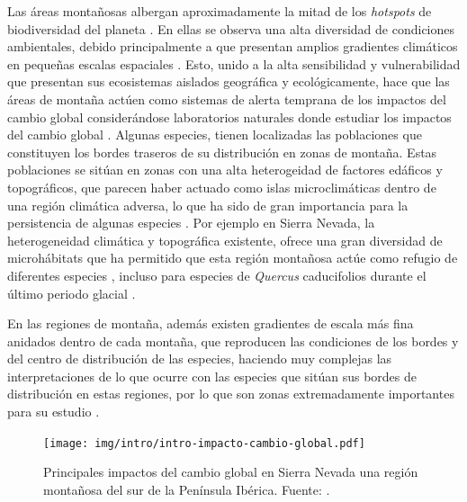 Las áreas montañosas albergan aproximadamente la mitad de los \emph{hotspots} de biodiversidad del planeta \autocite[][]{SpehnKorner2009MountainLaboratory,Kohleretal2014MountainsClimate}. En ellas se observa una alta diversidad de condiciones ambientales, debido principalmente a que presentan amplios gradientes climáticos en pequeñas escalas espaciales \autocites{Kohleretal2014MountainsClimate, Zamoraetal2021UniendoMacro}. Esto, unido a la alta sensibilidad y vulnerabilidad que presentan sus ecosistemas aislados geográfica y ecológicamente, hace que las áreas de montaña actúen como sistemas de alerta temprana de los impactos del cambio global \autocites{KohlerMaselli2009MountainsClimate,MacchiICIMOD2010MountainsWorld,Zamoraetal2015HuellaCambio,Zamoraetal2017MonitoringGlobal,Priceetal2011MountainForests} considerándose laboratorios naturales donde estudiar los impactos del cambio global \autocites{Zamora2010AreasProtegidas, DoblasMirandaetal2015ReassessingGlobal,Jumpetal2009AltitudeforlatitudeDisparity}.
Algunas especies, tienen localizadas las poblaciones que constituyen los bordes traseros de su distribución en zonas de montaña. Estas poblaciones se sitúan en zonas con una alta heterogeidad de factores edáficos y topográficos, que parecen haber actuado como islas microclimáticas dentro de una región climática adversa, lo que ha sido de gran importancia para la persistencia de algunas especies \autocites{MeineriHylander2017FinegrainLargedomain,AbelSchaadetal2014PersistenceTree}. Por ejemplo en Sierra Nevada, la heterogeneidad climática y topográfica existente, ofrece una gran diversidad de microhábitats que ha permitido que esta región montañosa actúe como refugio de diferentes especies \autocites{MedailDiadema2009GlacialRefugia,GomezLunt2007RefugiaRefugia,BlancoPastoretal2019TopographyExplains}, incluso para especies de \emph{Quercus} caducifolios durante el último periodo glacial \autocite{Breweretal2002SpreadDeciduous,Olaldeetal2002WhiteOaks,RodriguezSanchezetal2010TreeRange}.

En las regiones de montaña, además existen gradientes de escala más fina anidados dentro de cada montaña, que reproducen las condiciones de los bordes y del centro de distribución de las especies, haciendo muy complejas las interpretaciones de lo que ocurre con las especies que sitúan sus bordes de distribución en estas regiones, por lo que son zonas extremadamente importantes para su estudio \autocite{Jumpetal2009AltitudeforlatitudeDisparity}. 

\begin{figure}[H]
	\centering
	\texttt{[image: img/intro/intro-impacto-cambio-global.pdf]} \caption{Principales impactos del cambio global en Sierra Nevada una región montañosa del sur de la Península Ibérica. Fuente: \citet{Zamoraetal2015HuellaCambio}.}\label{fig:intro:cambio-global}
\end{figure} 

